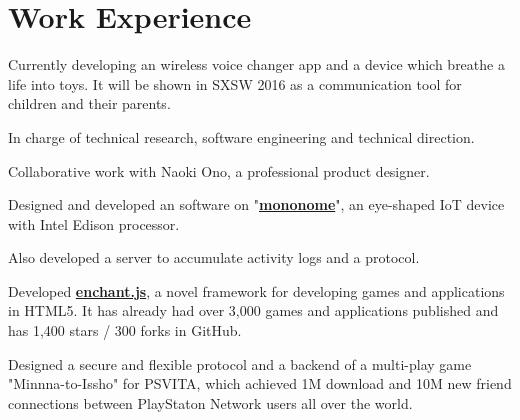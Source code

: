 \documentclass[letterpaper]{deedy-resume} %
\begin{document}
\begin{minipage}[t]{0.66\textwidth} %

\renewcommand{\baselinestretch}{0.93}


\section{Work Experience}

\vspace{4mm}
\begin{tightitemize}
\item Currently developing an wireless voice changer app and a device which breathe a life into toys. It will be shown in SXSW 2016 as a communication tool for children and their parents.
\item In charge of technical research, software engineering and technical direction.
\item Collaborative work with Naoki Ono, a professional product designer.
\end{tightitemize}

\vspace{2mm} %

\begin{tightitemize}
\item Designed and developed an software on "\textbf{\href{http://monono.me}{mononome}}", an eye-shaped IoT device with Intel Edison processor.
\item Also developed a server to accumulate activity logs and a protocol.
\end{tightitemize}

\vspace{2mm} 

\begin{tightitemize}
\item Developed \textbf{\href{http://enchantjs.com/}{enchant.js}}, a novel framework for developing games and applications in HTML5. It has already had over 3,000 games and applications published and has 1,400 stars / 300 forks in GitHub.
\item Designed a secure and flexible protocol and a backend of a multi-play game "Minnna-to-Issho" for PSVITA, which achieved 1M download and 10M new friend connections between PlayStaton Network users all over the world.
\end{tightitemize}


\end{minipage}
\end{document}
